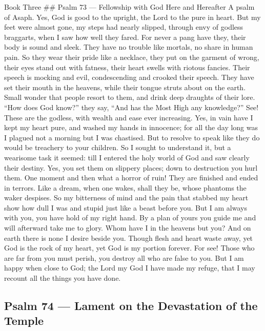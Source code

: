 Book Three \#\# Psalm 73 --- Fellowship with God Here and Hereafter A
psalm of Asaph.  Yes, God is good to the upright, the Lord
to the pure in heart.  But my feet were almost gone, my
steps had nearly slipped,  through envy of godless
braggarts, when I saw how well they fared.  For never a pang
have they, their body is sound and sleek.  They have no
trouble like mortals, no share in human pain.  So they wear
their pride like a necklace, they put on the garment of wrong,
 their eyes stand out with fatness, their heart swells with
riotous fancies.  Their speech is mocking and evil,
condescending and crooked their speech.  They have set their
mouth in the heavens, while their tongue struts about on the earth.
 Small wonder that people resort to them, and drink deep
draughts of their lore.  ``How does God know?'' they say,
``And has the Most High any knowledge?''  See! These are
the godless, with wealth and ease ever increasing.  Yes, in
vain have I kept my heart pure, and washed my hands in innocence;
 for all the day long was I plagued not a morning but I was
chastised.  But to resolve to speak like they do would be
treachery to your children.  So I sought to understand it,
but a wearisome task it seemed:  till I entered the holy
world of God and saw clearly their destiny.  Yes, you set
them on slippery places; down to destruction you hurl them.
 One moment and then what a horror of ruin! They are
finished and ended in terrors.  Like a dream, when one
wakes, shall they be, whose phantoms the waker despises. 
So my bitterness of mind and the pain that stabbed my heart
 show how dull I was and stupid just like a beast before
you.  But I am always with you, you have hold of my right
hand.  By a plan of yours you guide me and will afterward
take me to glory.  Whom have I in the heavens but you? And
on earth there is none I desire beside you.  Though flesh
and heart waste away, yet God is the rock of my heart, yet God is my
portion forever.  For see! Those who are far from you must
perish, you destroy all who are false to you.  But I am
happy when close to God; the Lord my God I have made my refuge, that I
may recount all the things you have done.

\hypertarget{psalm-74-lament-on-the-devastation-of-the-temple}{%
\subsection{Psalm 74 --- Lament on the Devastation of the
Temple}\label{psalm-74-lament-on-the-devastation-of-the-temple}}

